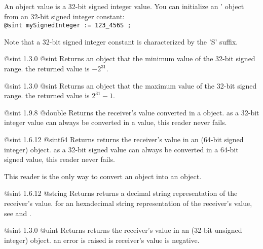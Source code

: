 
An  object value is a 32-bit signed integer value. You can initialize an ' object from an 32-bit signed integer constant:\\

\texttt{@sint mySignedInteger := 123\_456S ;}

Note that a 32-bit signed integer constant is characterized by the 'S' suffix.




{@sint}
{1.3.0}
{@sint}
{Returns an  object that the minimum value of the 32-bit signed range.}
{the returned value is $-2^{31}$.}





{@sint}
{1.3.0}
{@sint}
{Returns an  object that the maximum value of the 32-bit signed range.}
{the returned value is $2^{31}-1$.}





{@sint}
{1.9.8}
{@double}
{Returns the receiver's value converted in a  object.}
{as a 32-bit integer value can always be converted in a  value, this reader never fails.}





{@sint}
{1.6.12}
{@sint64}
{Returns returns the receiver's value in an  (64-bit signed integer) object.}
{as a 32-bit signed value can always be converted in a 64-bit signed value, this reader never fails.}

This reader is the only way to convert an  object into an  object.





{@sint}
{1.6.12}
{@string}
{Returns returns a decimal string representation of the receiver's value.}
{for an hexadecimal string representation of the receiver's value, see  and .}







{@sint}
{1.3.0}
{@uint}
{Returns returns the receiver's value in an  (32-bit unsigned integer) object.}
{an error is raised is receiver's value is negative.}


